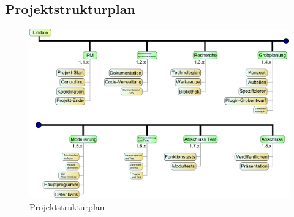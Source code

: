 \subsection{Projektstrukturplan}
\begin{figure}[!ht]
\center
\includegraphics[width=\textwidth, height=\textheight, keepaspectratio, angle=0]{images/psp}
\caption{Projektstrukturplan}
\end{figure}